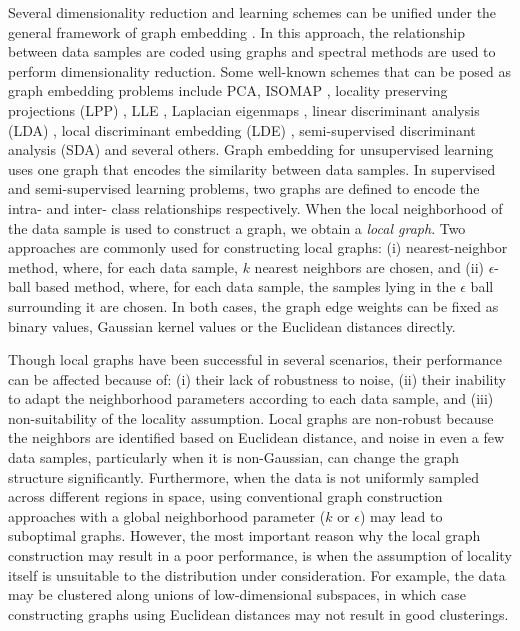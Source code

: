 Several dimensionality reduction and learning schemes can be unified under the general framework of graph embedding \cite{yan2007graph}. In this approach, the relationship between data samples are coded using graphs and spectral methods are used to perform dimensionality reduction. Some well-known schemes that can be posed as graph embedding problems include PCA, ISOMAP \cite{isomaps}, locality preserving projections (LPP) \cite{LPP}, LLE \cite{Saul00anintroduction}, Laplacian eigenmaps \cite{Belkin01laplacianeigenmaps} , linear discriminant analysis (LDA) \cite{keinosuke1990introduction}, local discriminant embedding (LDE) \cite{chen2005local}, semi-supervised discriminant analysis (SDA) \cite{cai2007semi} and several others. Graph embedding for unsupervised learning uses one graph that encodes the similarity between data samples. In supervised and semi-supervised learning problems, two graphs are defined to encode the intra- and inter- class relationships respectively. When the local neighborhood of the data sample is used to construct a graph, we obtain a \textit{local graph}. Two approaches are commonly used for constructing local graphs: (i) nearest-neighbor method, where, for each data sample, $k$ nearest neighbors are chosen, and (ii) $\epsilon$-ball based method, where, for each data sample, the samples lying in the $\epsilon$ ball surrounding it are chosen. In both cases, the graph edge weights can be fixed as binary values, Gaussian kernel values or the Euclidean distances directly.

Though local graphs have been successful in several scenarios, their performance can be affected because of: (i) their lack of robustness to noise, (ii) their inability to adapt the neighborhood parameters according to each data sample, and (iii) non-suitability of the locality assumption. Local graphs are non-robust because the neighbors are identified based on Euclidean distance, and noise in even a few data samples, particularly when it is non-Gaussian, can change the graph structure significantly. Furthermore, when the data is not uniformly sampled across different regions in space, using conventional graph construction approaches with a global neighborhood parameter ($k$ or $\epsilon$) may lead to suboptimal graphs. However, the most important reason why the local graph construction may result in a poor performance, is when the assumption of locality itself is unsuitable to the distribution under consideration. For example, the data may be clustered along unions of low-dimensional subspaces, in which case constructing graphs using Euclidean distances may not result in good clusterings.

